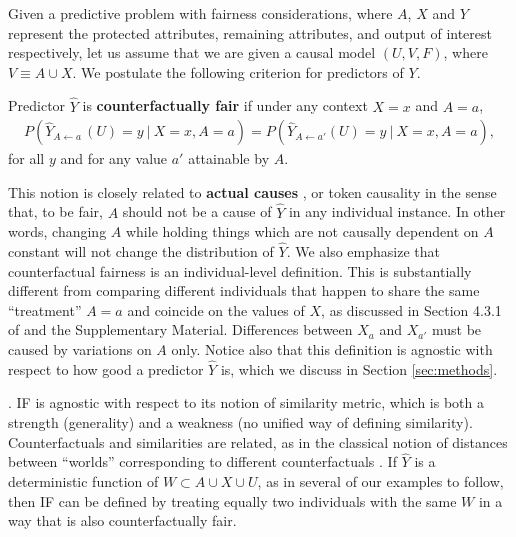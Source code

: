 Given a predictive problem with fairness considerations, where $A$, $X$ and $Y$
represent the protected attributes, remaining attributes, and output of interest respectively,
let us assume that we are given a causal model $(U, V, F)$, where $V \equiv A \cup X$.
We postulate the following criterion for predictors of $Y$.
\begin{define}
Predictor $\hat Y$ is {\bf counterfactually fair}
if under any context $X = x$ and $A = a$,
  \label{eq:cf_definition}
\begin{align}
  P(\hat Y_{A \leftarrow a\ }(U) = y\ |\ X = x, A = a)  =%
  P(\hat Y_{A \leftarrow a'}(U) = y\ |\ X = x, A = a), 
\end{align}
for all $y$ and for any value $a'$ attainable by $A$.
\end{define}

This notion is closely related to {\bf actual causes}
\cite{halpern:16}, or token causality in the sense that, to be fair,
$A$ should not be a cause of $\hat Y$ in any individual instance. In
other words, changing $A$ while holding things which are not causally
dependent on $A$ constant will not change the distribution of $\hat
Y$.
We also emphasize that
counterfactual fairness is an individual-level definition. This is
substantially different from comparing different individuals that happen to
share the same ``treatment'' $A = a$ and coincide on the values of
$X$, as discussed in Section 4.3.1 of \citep{pearl:16} and the
Supplementary Material. Differences between $X_a$ and $X_{a'}$ must be caused
by variations on $A$ only. Notice also that this definition is
agnostic with respect to how good a predictor $\hat Y$ is, which we
discuss in Section \ref{sec:methods}.

. IF is agnostic with
respect to its notion of similarity metric, which is both a strength
(generality) and a weakness (no unified way of defining similarity).
Counterfactuals and similarities are related, as in the classical
notion of distances between ``worlds'' corresponding to different
counterfactuals \cite{lewis:73}. If $\hat Y$ is a
deterministic function of $W \subset A \cup X \cup U$, as in several
of our examples to follow, then IF can be defined by treating equally two
individuals with the same $W$ in a way that is also counterfactually fair.

